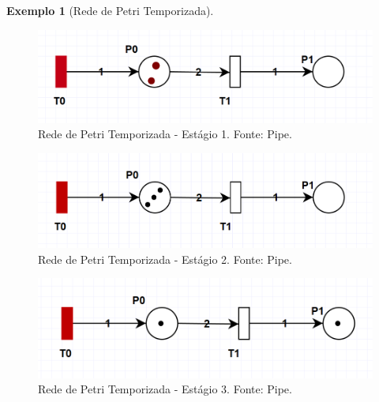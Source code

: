 \documentclass[
	12pt,				%
	openright,			%
	oneside,			%
	a4paper,			%
	english,			%
	brazil				%
	]{abntex2}
\theoremstyle{doispontos}
\newtheorem{exemplo}{Exemplo}
\begin{document}
\begin{exemplo} [Rede de Petri Temporizada] \label{exemplo_temporarizada}
\end{exemplo}

\begin{figure}[ht] 
	\centering
	\includegraphics[scale=0.23]{figuras/exemplo_rede_petri_temporizada_1.png}
	\caption[Rede de Petri Temporizada - Estágio 1]{Rede de Petri Temporizada - Estágio 1. Fonte: Pipe.}
	\label{fig:rede_petri_temporizada_ex_01}
\end{figure}
\FloatBarrier

\begin{figure}[ht] 
	\centering
	\includegraphics[scale=0.55]{figuras/exemplo_rede_petri_temporizada_2.png}
	\caption[Rede de Petri Temporizada - Estágio 2]{Rede de Petri Temporizada - Estágio 2. Fonte: Pipe.}
	\label{fig:rede_petri_temporizada_ex_02}
\end{figure}
\FloatBarrier

\begin{figure}[ht] 
	\centering
	\includegraphics[scale=0.55]{figuras/exemplo_rede_petri_temporizada_3.png}
	\caption[Rede de Petri Temporizada - Estágio 3]{Rede de Petri Temporizada - Estágio 3. Fonte: Pipe.}
	\label{fig:rede_petri_temporizada_ex_03}
\end{figure}
\FloatBarrier
\end{document}
